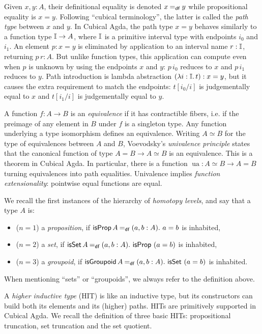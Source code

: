 \documentclass[runningheads]{llncs}
\begin{document}
Given $x, y : A$, their definitional equality is denoted $x \mathbin{=_\mathsf{df}} y$ while propositional equality is $x = y$.
Following ``cubical terminology'', the latter is called the \emph{path type} between $x$ and $y$.
In Cubical Agda, the path type $x = y$ behaves similarly to a function type $\mathbb{I} \to A$, where $\mathbb{I}$ is a primitive interval type with endpoints $i_0$ and $i_1$.
An element $p : x = y$ is eliminated by application to an interval name $r : \mathbb{I}$, returning $p \, r : A$.
But unlike function types, this application can compute even when $p$ is unknown by using the endpoints $x$ and $y$: $p \,i_0$ reduces to $x$ and $p \,i_1$ reduces to $y$.
Path introduction is lambda abstraction $(\lambda i : \mathbb{I}.\,t) : x = y$, but it causes the extra requirement to match the endpoints: $t[i_0 / i]$ is judgementally equal to $x$ and $t[i_1 / i]$ is judgementally equal to  $y$. 

A function $f : A \to B$ is an \emph{equivalence} if it has contractible fibers, i.e. if the preimage of any element in $B$ under $f$ is a singleton type. Any function underlying a type isomorphism defines an equivalence. Writing $A \simeq B$ for the type of equivalences between $A$ and $B$, Voevodsky's \emph{univalence principle} states that the canonical function of type $A = B \to A \simeq B$ is an equivalence. This is a theorem in Cubical Agda. In particular, there is a function $\operatorname{ua} : A \simeq B \to A = B$ turning equivalences into path equalities. Univalence implies \emph{function extensionality}: pointwise equal functions are equal.

We recall the first instances of the hierarchy of \emph{homotopy levels}, and say that a type $A$ is:
\begin{itemize}
  \item ($n = 1$) a \emph{proposition}, if
    $\operatorname{\mathsf{isProp}} A \mathbin{=_\mathsf{df}} (a , b : A)\mathpunct{.}\, a = b$ is inhabited,
  \item ($n = 2$) a \emph{set}, if
    $\operatorname{\mathsf{isSet}} A \mathbin{=_\mathsf{df}} (a, b : A)\mathpunct{.}\, \operatorname{\mathsf{isProp}} \ (a = b)$ is inhabited,
  \item ($n = 3$) a \emph{groupoid}, if
    $\operatorname{\mathsf{isGroupoid}} A \mathbin{=_\mathsf{df}} (a, b : A)\mathpunct{.}\, \operatorname{\mathsf{isSet}} \ (a = b)$ is inhabited.
\end{itemize}
When mentioning \enquote{sets} or \enquote{groupoids}, we always refer to the definition above.

A \emph{higher inductive type} (HIT) is like an inductive type, but its constructors can build both its elements and its (higher) paths. HITs are primitively supported in Cubical Agda. We recall the definition of three basic HITs: propositional truncation, set truncation and the set quotient. 
\end{document}
